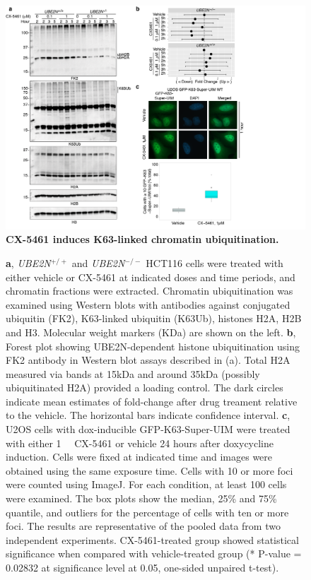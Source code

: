 \begin{figure}
    \centering
    \includegraphics[width=1\textwidth]{../figures/Figure4_chromatin_ubiquitination}
    \caption[Chromatin ubiquitination]
            {\small{\textbf{CX-5461 induces K63-linked chromatin ubiquitination.}}
            }
        \label{fig:chromatin-ubiquitination}
\end{figure}
\addtocounter{figure}{-1}
\begin{figure}
  \caption[]{
        \newline
        \textbf{a}, \textit{UBE2N$^{+/+}$} and \textit{UBE2N$^{-/-}$} HCT116 cells were treated with either vehicle or CX-5461 at indicated doses and time periods, and chromatin fractions were extracted. Chromatin ubiquitination was examined using Western blots with antibodies against conjugated ubiquitin (FK2), K63-linked ubiquitin (K63Ub), histones H2A, H2B and H3. Molecular weight markers (KDa) are shown on the left. 
        \newline
        \textbf{b}, Forest plot showing UBE2N-dependent histone ubiquitination using FK2 antibody in Western blot assays described in (a). Total H2A measured via bands at 15kDa  and around 35kDa (possibly ubiquitinated H2A) provided a loading control. The dark circles indicate mean estimates of fold-change after drug treament relative to the vehicle. The horizontal bars indicate confidence interval.
        \newline
        \textbf{c}, U2OS cells with dox-inducible GFP-K63-Super-UIM were treated with either \SI{1}{\micro\Molar} CX-5461 or vehicle 24 hours after doxycycline induction. Cells were fixed at indicated time and images were obtained using the same exposure time. Cells with 10 or more foci were counted using ImageJ. For each condition, at least 100 cells were examined.  The box  plots show the median, 25\% and 75\% quantile, and outliers for the percentage of cells with ten or more foci. The results are representative of the pooled data from two independent experiments. CX-5461-treated group showed statistical significance when compared with vehicle-treated group (* P-value = 0.02832 at significance level at 0.05, one-sided unpaired t-test). 
                }
 \end{figure}
\clearpage

